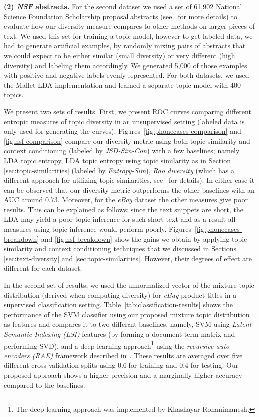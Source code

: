 \documentclass{article} %
\begin{document}
{\bf (2) {\em NSF}
abstracts.} For the second dataset we used a set of 61,902 National Science Foundation
Scholarship proposal abstracts (see~\cite{bache:2013} for more details) to evaluate how our diversity measure
compares to other methods on larger pieces of text. We used this set
for training a topic model, however to get labeled data, we had to
generate artificial examples, by randomly mixing pairs of abstracts that we
could expect to be either similar (small diversity) or very different
(high diversity) and labeling them accordingly. We generated 5,000 of
those examples with positive and negative labels evenly represented. For both datasets, we used the Mallet LDA implementation and learned a separate topic model with $400$ topics.

We present two sets of results. First, we present
ROC curves comparing different entropic measures of topic diversity in an unsupervised setting 
(labeled data is only used for generating the curves). Figures~\ref{fig:phonecases-comparison} and \ref{fig:nsf-comparison}
compare our diversity metric using both topic similarity and context
conditioning (labeled by {\em JSD-Sim-Con}) with a few baselines;
namely LDA topic entropy, LDA topic entropy using topic similarity as
in Section \ref{sec:topic-similarities} 
(labeled by {\em Entropy-Sim}), {\em Rao diversity}
(which has a different approach for utilizing topic similarities, see~\cite{bache:2013} for details). In either case it can be observed
that our diversity metric outperforms the other baselines with an AUC
around $0.73$. Moreover, for the {\em eBay} dataset the other measures
give poor results. This can be explained as follows: since the
text snippets are short, the LDA may yield a poor topic inference for
such short text and as a result all measures using topic inference
would perform poorly. Figures~\ref{fig:phonecases-breakdown} and
\ref{fig:nsf-breakdown} show the gains we obtain by applying topic
similarity and context conditioning techniques that we discussed in
Sections \ref{sec:text-diversity} and \ref{sec:topic-similarities}. However, their degrees of effect are different for each dataset.  

In the second set of results, we used the unnormalized vector of the
mixture topic distribution (derived when computing diversity) for
{\em eBay} product titles in a supervised classification
setting. Table~\ref{tab:classification-results} shows
the performance of the SVM classifier using our proposed mixture topic
distribution as features and compares it to two different baselines, namely, SVM using
{\em Latent Semantic Indexing (LSI)} features (by forming a
document-term matrix and performing SVD), and a deep learning
approach\footnote{The deep learning approach was
  implemented by Khashayar Rohanimanesh.} 
using the {\em recursive auto-encoders (RAE)} framework described
in~\cite{Socher:2011:SRA:2145432.2145450}. These results are averaged
over five different cross-validation splits using $0.6$ for training
and $0.4$ for testing. Our proposed approach shows a higher precision
and a marginally higher accuracy compared to the baselines.
\end{document}
